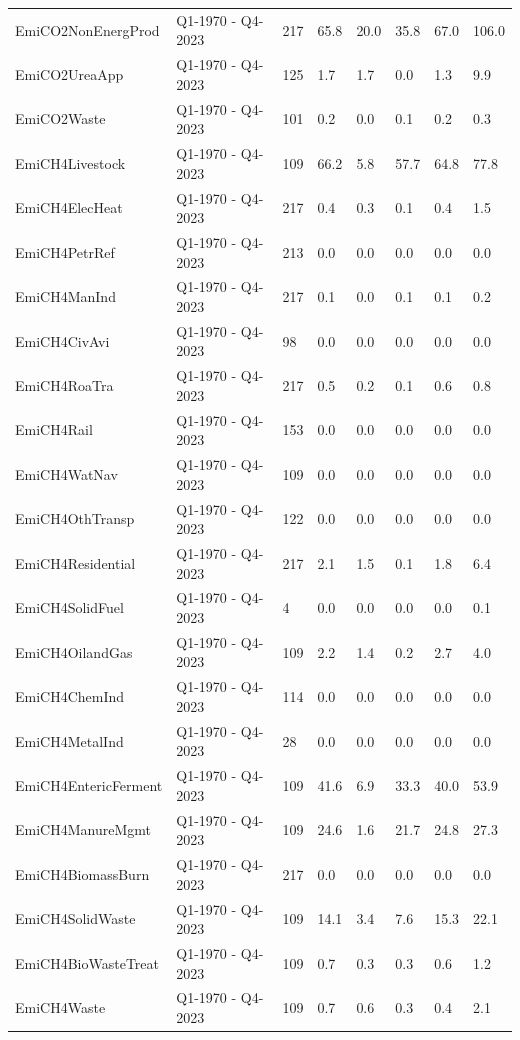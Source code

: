 \begin{longtable}[t]{llllllll}
EmiCO2NonEnergProd & Q1-1970 - Q4-2023 & 217 & 65.8 & 20.0 & 35.8 & 67.0 & 106.0\\
EmiCO2UreaApp & Q1-1970 - Q4-2023 & 125 & 1.7 & 1.7 & 0.0 & 1.3 & 9.9\\
EmiCO2Waste & Q1-1970 - Q4-2023 & 101 & 0.2 & 0.0 & 0.1 & 0.2 & 0.3\\
\addlinespace
EmiCH4Livestock & Q1-1970 - Q4-2023 & 109 & 66.2 & 5.8 & 57.7 & 64.8 & 77.8\\
EmiCH4ElecHeat & Q1-1970 - Q4-2023 & 217 & 0.4 & 0.3 & 0.1 & 0.4 & 1.5\\
EmiCH4PetrRef & Q1-1970 - Q4-2023 & 213 & 0.0 & 0.0 & 0.0 & 0.0 & 0.0\\
EmiCH4ManInd & Q1-1970 - Q4-2023 & 217 & 0.1 & 0.0 & 0.1 & 0.1 & 0.2\\
EmiCH4CivAvi & Q1-1970 - Q4-2023 & 98 & 0.0 & 0.0 & 0.0 & 0.0 & 0.0\\
\addlinespace
EmiCH4RoaTra & Q1-1970 - Q4-2023 & 217 & 0.5 & 0.2 & 0.1 & 0.6 & 0.8\\
EmiCH4Rail & Q1-1970 - Q4-2023 & 153 & 0.0 & 0.0 & 0.0 & 0.0 & 0.0\\
EmiCH4WatNav & Q1-1970 - Q4-2023 & 109 & 0.0 & 0.0 & 0.0 & 0.0 & 0.0\\
EmiCH4OthTransp & Q1-1970 - Q4-2023 & 122 & 0.0 & 0.0 & 0.0 & 0.0 & 0.0\\
EmiCH4Residential & Q1-1970 - Q4-2023 & 217 & 2.1 & 1.5 & 0.1 & 1.8 & 6.4\\
\addlinespace
EmiCH4SolidFuel & Q1-1970 - Q4-2023 & 4 & 0.0 & 0.0 & 0.0 & 0.0 & 0.1\\
EmiCH4OilandGas & Q1-1970 - Q4-2023 & 109 & 2.2 & 1.4 & 0.2 & 2.7 & 4.0\\
EmiCH4ChemInd & Q1-1970 - Q4-2023 & 114 & 0.0 & 0.0 & 0.0 & 0.0 & 0.0\\
EmiCH4MetalInd & Q1-1970 - Q4-2023 & 28 & 0.0 & 0.0 & 0.0 & 0.0 & 0.0\\
EmiCH4EntericFerment & Q1-1970 - Q4-2023 & 109 & 41.6 & 6.9 & 33.3 & 40.0 & 53.9\\
\addlinespace
EmiCH4ManureMgmt & Q1-1970 - Q4-2023 & 109 & 24.6 & 1.6 & 21.7 & 24.8 & 27.3\\
EmiCH4BiomassBurn & Q1-1970 - Q4-2023 & 217 & 0.0 & 0.0 & 0.0 & 0.0 & 0.0\\
EmiCH4SolidWaste & Q1-1970 - Q4-2023 & 109 & 14.1 & 3.4 & 7.6 & 15.3 & 22.1\\
EmiCH4BioWasteTreat & Q1-1970 - Q4-2023 & 109 & 0.7 & 0.3 & 0.3 & 0.6 & 1.2\\
EmiCH4Waste & Q1-1970 - Q4-2023 & 109 & 0.7 & 0.6 & 0.3 & 0.4 & 2.1\\

\end{longtable}
